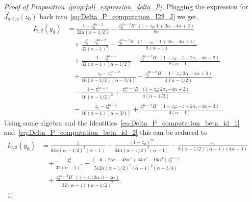 \begin{proof}[Proof of Proposition~\ref{prop:full_expression_delta_P}]
Plugging the expression for $J_{a,b,c}^\prime(z_0)$ back into~\eqref{eq:Delta_P_computation_I22_J} we get,
\begin{align*}
	I_{2,2}(y_0) 
	&= \frac{1 -z_0^{4\alpha-2}}{32\alpha(\alpha-1/2)} 
		-  \frac{z_0^{4\alpha -2}B^-(1-z_0;1+2\alpha,-4\alpha+2)}{8\alpha} \\
	&\hspace{10pt}+ \frac{z_0^2 -z_0^{4\alpha-2}}{32(\alpha-1)^2}  
		- \frac{z_0^{4\alpha -2}B^-(1-z_0;-1+2\alpha,-4\alpha+4)}{8(\alpha-1)} \\
	&\hspace{10pt}+ \frac{1 -z_0^{4\alpha-2}}{32(\alpha-1)(\alpha-1/2)}  
		- \frac{z_0^{4\alpha -2}B^-(1-z_0;-1+2\alpha,-4\alpha+2)}{8(\alpha-1)} \\
	&\hspace{10pt}+ \frac{z_0 -z_0^{4\alpha-2}}{16(\alpha-1/2)(\alpha-3/4)}  
		- \frac{z_0^{4\alpha -2}B^-(1-z_0;2\alpha,-4\alpha+3)}{4(\alpha-1/2)} \\
	&\hspace{10pt}- \frac{1 -z_0^{4\alpha-2}}{16(\alpha-1/2)^2}  
		+ \frac{z_0^{4\alpha -2}B^-(1-z_0;2\alpha,-4\alpha+2)}{4(\alpha-1/2)}\\
	&\hspace{10pt}-\frac{z_0 -z_0^{4\alpha-2}}{16(\alpha-1)(\alpha-3/4)} 
		+ \frac{z_0^{4\alpha -2}B^-(1-z_0;-1+2\alpha,-4\alpha+3)}{4(\alpha-1)}.
\end{align*}
Using some algebra and the identities~\eqref{eq:Delta_P_computation_beta_id_1} and~\eqref{eq:Delta_P_computation_beta_id_2}  this can be reduced to
\begin{equation}\label{eq:Delta_P_computation_I22}
\begin{aligned}
	I_{2,2}(y_0)
	&=\frac{1}{64\alpha(\alpha-1/2)^2(\alpha-1)} -\frac{(1 - z_0)^{2\alpha}}{64\alpha(\alpha-1/2)^2 (\alpha-1)} 
		- \frac{z_0}{8(\alpha-1/2)(\alpha-1)(4\alpha-3)}\\ 
	&\hspace{10pt}+ \frac{z_0^2}{32(\alpha-1)^2} + \frac{(-6 + 25\alpha - 48\alpha^2 + 44\alpha^3 -16\alpha^4) 
   		z_0^{4\alpha-2}}{512\alpha(\alpha-1/2)^2(\alpha-1)^2(\alpha-3/4)} \\
	&\hspace{10pt}+ \frac{z_0^{4\alpha-2}B^-(1 - z_0; 2\alpha, 3 - 4\alpha)}{32(\alpha-1)(\alpha-1/2)^2}.
\end{aligned}
\end{equation}

%
%


\end{proof}
